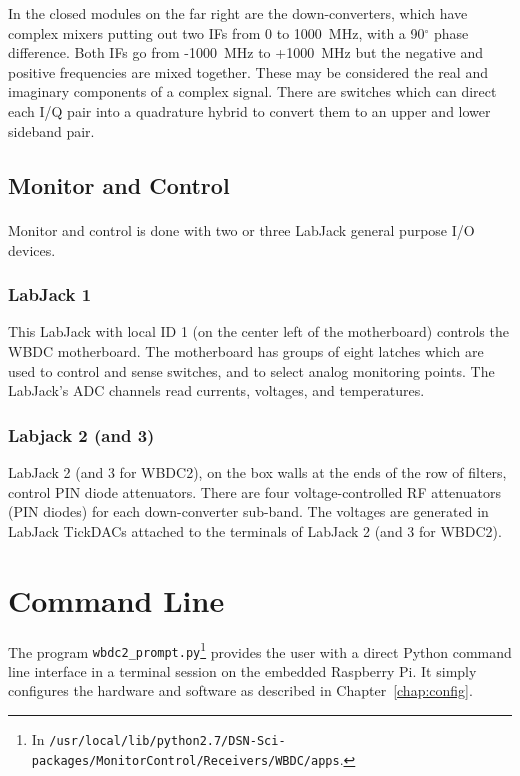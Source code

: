 \documentclass[letterpaper,11pt]{book}
\begin{document}
In the closed modules on the far right are the down-converters, which have 
complex mixers putting out two IFs
from 0 to 1000~MHz, with a 90$^{\circ}$ phase difference.
Both IFs go from -1000~MHz to +1000~MHz but the negative and positive
frequencies are mixed together.
These may be considered the real and imaginary components of
a complex signal.
There are switches which can direct each I/Q pair into a quadrature
hybrid to convert them to an upper and lower sideband pair.

\section{Monitor and Control}

Monitor and control is done with two or three 
LabJack\textsuperscript{\textregistered} general purpose I/O devices. 

\subsection{LabJack 1}

This LabJack with local ID 1 (on the center left of the motherboard) controls 
the WBDC motherboard.   The motherboard has groups of
eight latches which are used to control and sense switches, and to select
analog monitoring points.  The LabJack's ADC channels read currents, voltages, 
and temperatures. 

\subsection{Labjack 2 (and 3)}

LabJack 2 (and 3 for WBDC2), on the box walls at the ends of the row of 
filters, control PIN diode attenuators.
There are four voltage-controlled RF attenuators (PIN diodes) for each
down-converter sub-band.  The voltages are generated in LabJack
TickDACs attached to the terminals of LabJack 2 (and 3 for WBDC2).


\chapter{Command Line}\label{chap:cmd-line}

The program {\tt wbdc2\_prompt.py}\footnote{In
{\scriptsize \tt /usr/local/lib/python2.7/DSN-Sci-packages/MonitorControl/Receivers/WBDC/apps}.}
provides the user with a direct Python command line interface in a terminal 
session on the embedded Raspberry Pi.  It simply configures the hardware and 
software as described in Chapter~\ref{chap:config}.
\end{document}
